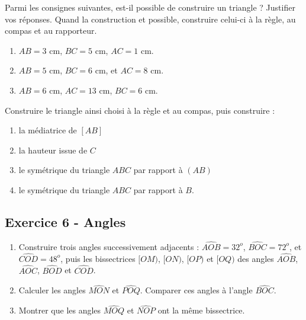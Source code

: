 \documentclass[14pt]{extreport}
\theoremstyle{plain}
\begin{document}
Parmi les consignes suivantes, est-il possible de construire un triangle ? Justifier vos réponses.
Quand la construction et possible, construire celui-ci à la règle, au compas et au rapporteur.
\begin{enumerate}
\item $AB= 3$ cm, $BC = 5$ cm, $AC = 1$ cm. 
\item $AB= 5$ cm, $BC = 6$ cm, et $AC = 8$ cm. 
\item $AB = 6$ cm, $AC = 13$ cm, $BC = 6$ cm.
\end{enumerate}
Construire le triangle ainsi choisi à la règle et au compas, puis construire : 
\begin{enumerate}
\item la médiatrice de $[AB]$
\item la hauteur issue de $C$
\item le symétrique du triangle $ABC$ par rapport à $(AB)$
\item le symétrique du triangle $ABC$ par rapport à $B$.
\end{enumerate} 
\subsection*{Exercice 6 - Angles}

\begin{enumerate}
\item Construire trois angles successivement adjacents : $\widehat{AOB}= 32^o$, $\widehat{BOC}= 72^o$, et $\widehat{COD}= 48^o$, puis les bissectrices $[OM)$, $[ON)$, $[OP)$ et $[OQ)$ des angles $\widehat{AOB}$, $\widehat{AOC}$, $\widehat{BOD}$ et $\widehat{COD}$. 
\item Calculer les angles $\widehat{MON}$ et $\widehat{POQ}$. Comparer
ces angles à l'angle $\widehat{BOC}$. 
\item Montrer que les angles $\widehat{MOQ}$ et $\widehat{NOP}$ ont la même bissectrice. 
\end{enumerate}
\end{document}
